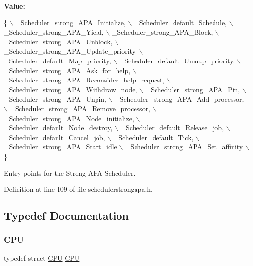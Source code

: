{\bfseries Value\+:}
\begin{DoxyCode}
\{ \(\backslash\)
    \_Scheduler\_strong\_APA\_Initialize, \(\backslash\)
    \_Scheduler\_default\_Schedule, \(\backslash\)
    \_Scheduler\_strong\_APA\_Yield, \(\backslash\)
    \_Scheduler\_strong\_APA\_Block, \(\backslash\)
    \_Scheduler\_strong\_APA\_Unblock, \(\backslash\)
    \_Scheduler\_strong\_APA\_Update\_priority, \(\backslash\)
    \_Scheduler\_default\_Map\_priority, \(\backslash\)
    \_Scheduler\_default\_Unmap\_priority, \(\backslash\)
    \_Scheduler\_strong\_APA\_Ask\_for\_help, \(\backslash\)
    \_Scheduler\_strong\_APA\_Reconsider\_help\_request, \(\backslash\)
    \_Scheduler\_strong\_APA\_Withdraw\_node, \(\backslash\)
    \_Scheduler\_strong\_APA\_Pin, \(\backslash\)
    \_Scheduler\_strong\_APA\_Unpin, \(\backslash\)
    \_Scheduler\_strong\_APA\_Add\_processor, \(\backslash\)
    \_Scheduler\_strong\_APA\_Remove\_processor, \(\backslash\)
    \_Scheduler\_strong\_APA\_Node\_initialize, \(\backslash\)
    \_Scheduler\_default\_Node\_destroy, \(\backslash\)
    \_Scheduler\_default\_Release\_job, \(\backslash\)
    \_Scheduler\_default\_Cancel\_job, \(\backslash\)
    \_Scheduler\_default\_Tick, \(\backslash\)
    \_Scheduler\_strong\_APA\_Start\_idle \(\backslash\)
    \_Scheduler\_strong\_APA\_Set\_affinity \(\backslash\)
  \}
\end{DoxyCode}


Entry points for the Strong A\+PA Scheduler. 



Definition at line 109 of file schedulerstrongapa.\+h.



\subsection{Typedef Documentation}
\mbox{\label{group__RTEMSScoreSchedulerStrongAPA_gaddffe010d6ab143ff5692b890137dbfd}} 
\subsubsection{\texorpdfstring{C\+PU}{CPU}}
{\footnotesize\ttfamily typedef struct \hyperlink{structCPU}{C\+PU} \hyperlink{structCPU}{C\+PU}}



